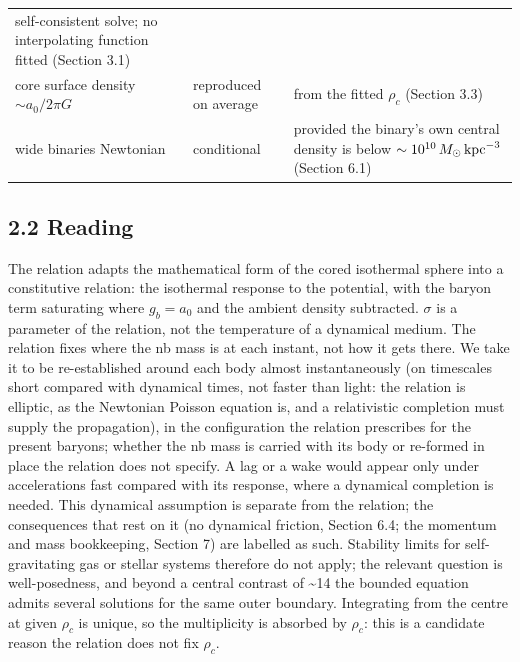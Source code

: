 \documentclass[
  10pt,
]{article}
\begin{document}
\begin{longtable}[]{@{}lll@{}}
\begin{minipage}[t]{0.50\columnwidth}
self-consistent solve; no interpolating function fitted (Section 3.1)\strut
\end{minipage}\tabularnewline
\begin{minipage}[t]{0.24\columnwidth}\raggedright
core surface density $\sim a_0/2\pi G$\strut
\end{minipage} & \begin{minipage}[t]{0.20\columnwidth}\raggedright
reproduced on average\strut
\end{minipage} & \begin{minipage}[t]{0.50\columnwidth}\raggedright
from the fitted $\rho_c$ (Section 3.3)\strut
\end{minipage}\tabularnewline
\begin{minipage}[t]{0.24\columnwidth}\raggedright
wide binaries Newtonian\strut
\end{minipage} & \begin{minipage}[t]{0.20\columnwidth}\raggedright
conditional\strut
\end{minipage} & \begin{minipage}[t]{0.50\columnwidth}\raggedright
provided the binary's own central density is below $\sim10^{10}\,M_\odot\,{\rm kpc}^{-3}$ (Section 6.1)\strut
\end{minipage}\tabularnewline
\bottomrule
\end{longtable}

\subsection{2.2 Reading}\label{reading}

The relation adapts the mathematical form of the cored isothermal sphere into a constitutive relation: the isothermal response to the potential, with the baryon term saturating where $g_b=a_0$ and the ambient density subtracted. $\sigma$ is a parameter of the relation, not the temperature of a dynamical medium. The relation fixes where the nb mass is at each instant, not how it gets there. We take it to be re-established around each body almost instantaneously (on timescales short compared with dynamical times, not faster than light: the relation is elliptic, as the Newtonian Poisson equation is, and a relativistic completion must supply the propagation), in the configuration the relation prescribes for the present baryons; whether the nb mass is carried with its body or re-formed in place the relation does not specify. A lag or a wake would appear only under accelerations fast compared with its response, where a dynamical completion is needed. This dynamical assumption is separate from the relation; the consequences that rest on it (no dynamical friction, Section 6.4; the momentum and mass bookkeeping, Section 7) are labelled as such. Stability limits for self-gravitating gas or stellar systems therefore do not apply; the relevant question is well-posedness, and beyond a central contrast of \textasciitilde{}14 the bounded equation admits several solutions for the same outer boundary. Integrating from the centre at given $\rho_c$ is unique, so the multiplicity is absorbed by $\rho_c$: this is a candidate reason the relation does not fix $\rho_c$.
\end{document}
